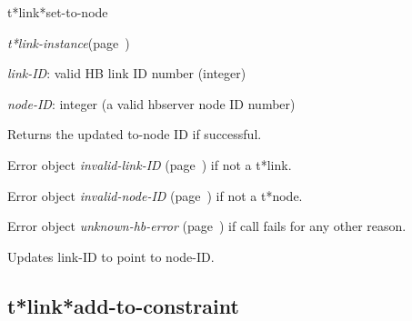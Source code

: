 \begin{description}
\item [Name:]  t*link*set-to-node

\item [Class:] {\sl t*link-instance}\hfill(page~\pageref{t*link-instance})

\item [Parameters:]
\item {\sl link-ID}:  
valid HB link ID number (integer)

\item {\sl node-ID}:  
integer (a valid hbserver node ID number)


\item [Return-value:]
Returns the updated to-node ID if successful.

Error object {\sl invalid-link-ID} (page~\pageref{invalid-link-ID}) if not a t*link.

Error object {\sl invalid-node-ID} (page~\pageref{invalid-node-ID}) if not a t*node.

Error object {\sl unknown-hb-error} (page~\pageref{unknown-hb-error}) if call fails
for any other reason.

\item [Description:]

Updates link-ID to point to node-ID.

\item [Public:]



\end{description}
\horizontalline

\subsection{t*link*add-to-constraint}
\label{t*link*add-to-constraint}


